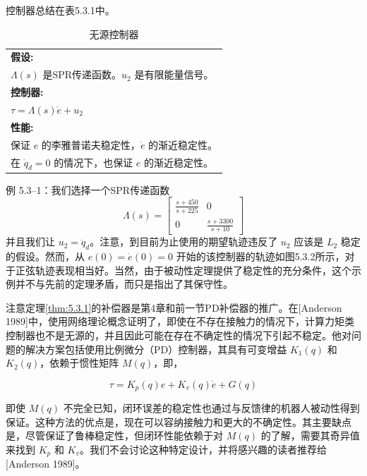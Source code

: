 \documentclass[UTF8,12pt,a4paper]{ctexart}
\begin{document}
控制器总结在表5.3.1中。

\begin{table}[htbp]
\centering
\caption{无源控制器}
\label{tab:5.3.1}
\begin{tabular}{@{}l@{}}
\toprule
\textbf{假设:} \\
\quad $\Lambda(s)$ 是SPR传递函数。$u_2$ 是有限能量信号。 \\[0.8em]
\midrule
\textbf{控制器:} \\[0.5em]
\quad $\displaystyle \tau = \Lambda(s)\dot{e} + u_2$ \\[1em]
\midrule
\textbf{性能:} \\
\quad 保证 $e$ 的李雅普诺夫稳定性，$\dot{e}$ 的渐近稳定性。 \\
\quad 在 $\dot{q}_d = 0$ 的情况下，也保证 $e$ 的渐近稳定性。 \\
\bottomrule
\end{tabular}
\end{table}

\begin{example}[无源控制器]
例 5.3--1：我们选择一个SPR传递函数
\begin{equation}
\Lambda(s) = \begin{bmatrix} \frac{s+450}{s+225} & 0 \\ 0 & \frac{s+3300}{s+10} \end{bmatrix}
\end{equation}
并且我们让 $u_2=\ddot{q}_d$。注意，到目前为止使用的期望轨迹违反了 $u_2$ 应该是 $L_2$ 稳定的假设。然而，从 $e(0) = \dot{e}(0) = 0$ 开始的该控制器的轨迹如图5.3.2所示，对于正弦轨迹表现相当好。当然，由于被动性定理提供了稳定性的充分条件，这个示例并不与先前的定理矛盾，而只是指出了其保守性。
\end{example}

注意定理\ref{thm:5.3.1}的补偿器是第4章和前一节PD补偿器的推广。在[Anderson 1989]中，使用网络理论概念证明了，即使在不存在接触力的情况下，计算力矩类控制器也不是无源的，并且因此可能在存在不确定性的情况下引起不稳定。他对问题的解决方案包括使用比例微分（PD）控制器，其具有可变增益 $K_1(q)$ 和 $K_2(q)$，依赖于惯性矩阵 $M(q)$，即，

\begin{equation}\label{eq:5.3.3}
\tau = K_p(q)e + K_v(q)\dot{e} + G(q)
\end{equation}

即使 $M(q)$ 不完全已知，闭环误差的稳定性也通过与反馈律的机器人被动性得到保证。这种方法的优点是，现在可以容纳接触力和更大的不确定性。其主要缺点是，尽管保证了鲁棒稳定性，但闭环性能依赖于对 $M(q)$ 的了解，需要其奇异值来找到 $K_p$ 和 $K_v$。我们不会讨论这种特定设计，并将感兴趣的读者推荐给[Anderson 1989]。
\end{document}
